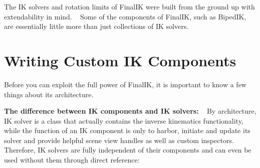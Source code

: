 The IK solvers and rotation limits of Final\+IK were built from the ground up with extendability in mind. ~\newline
Some of the components of Final\+IK, such as Biped\+IK, are essentially little more than just collections of IK solvers.\hypertarget{page13_customcomponents}{}\section{Writing Custom I\+K Components}\label{page13_customcomponents}
Before you can exploit the full power of Final\+IK, it is important to know a few things about it\textquotesingle{}s architecture.

{\bfseries The difference between IK components and IK solvers\+:} ~\newline
 By architecture, IK solver is a class that actually contains the inverse kinematics functionality, while the function of an IK component is only to harbor, initiate and update it\textquotesingle{}s solver and provide helpful scene view handles as well as custom inspectors. ~\newline
 ~\newline
 Therefore, IK solvers are fully independent of their components and can even be used without them through direct reference\+:


